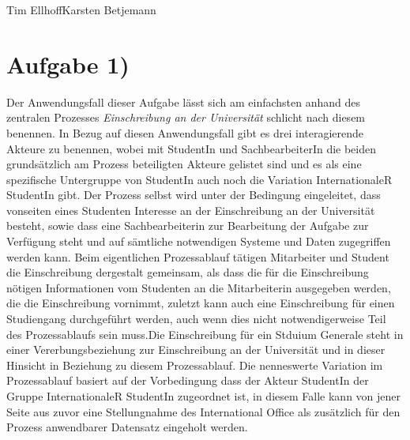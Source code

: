 \documentclass{swp1}
\begin{document}
          {Tim Ellhoff}{Karsten Betjemann}{}
          
\section*{Aufgabe 1)}

Der Anwendungsfall dieser Aufgabe lässt sich am einfachsten anhand des zentralen Prozesses \emph{Einschreibung an der Universität} schlicht nach diesem benennen.\newline
In Bezug auf diesen Anwendungsfall gibt es drei interagierende Akteure zu benennen, wobei mit StudentIn und SachbearbeiterIn die beiden grundsätzlich am Prozess beteiligten Akteure gelistet sind und es als eine spezifische Untergruppe von StudentIn auch noch die Variation InternationaleR StudentIn gibt.\newline
Der Prozess selbst wird unter der Bedingung eingeleitet, dass vonseiten eines Studenten Interesse an der Einschreibung an der Universität besteht, sowie dass eine Sachbearbeiterin zur Bearbeitung der Aufgabe zur Verfügung steht und auf sämtliche notwendigen Systeme und Daten zugegriffen werden kann.\newline
Beim eigentlichen Prozessablauf tätigen Mitarbeiter und Student die Einschreibung dergestalt gemeinsam, als dass die für die Einschreibung nötigen Informationen vom Studenten an die Mitarbeiterin ausgegeben werden, die die Einschreibung vornimmt, zuletzt kann auch eine Einschreibung für einen Studiengang durchgeführt werden, auch wenn dies nicht notwendigerweise Teil des Prozessablaufs sein muss.Die Einschreibung für ein Stduium Generale steht in einer Vererbungsbeziehung zur Einschreibung an der Universität und in dieser Hinsicht in Beziehung zu diesem Prozessablauf.\newline
Die nenneswerte Variation im Prozessablauf basiert auf der Vorbedingung dass der Akteur StudentIn der Gruppe InternationaleR StudentIn zugeordnet ist, in diesem Falle kann von jener Seite aus zuvor eine Stellungnahme des International Office als zusätzlich für den Prozess anwendbarer Datensatz eingeholt werden.
\end{document}
